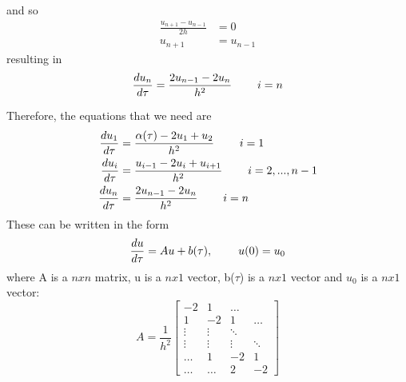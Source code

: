 \documentclass{article}
\begin{document}
and so
\begin{equation*}
\begin{split}
    \frac{u_{n+1}-u_{n-1}}{2h} &= 0 \\
    u_{n+1} &= u_{n-1}
\end{split}
\end{equation*}
resulting in
\begin{equation*}
    \frac{d u_n}{d\tau} = \frac{2u_{n-1} - 2u_n}{h^2}  \hspace{0.8cm} i = n
\end{equation*}

\noindent
Therefore, the equations that we need are
\begin{equation*}
\begin{split}
    \frac{d u_1}{d\tau} &= \frac{\alpha(\tau) - 2u_1 + u_{2}}{h^2}  \hspace{0.8cm} i = 1 \\
    \frac{d u_i}{d\tau} &= \frac{u_{i-1} - 2u_i + u_{i+1}}{h^2}  \hspace{0.8cm} i = 2, ..., n-1    \\
    \frac{d u_n}{d\tau} &= \frac{2u_{n-1} - 2u_n}{h^2}  \hspace{0.8cm} i = n
\end{split}
\end{equation*}
These can be written in the form
\begin{equation*}
    \frac{d u}{d \tau} = Au + b(\tau), \hspace{0.8cm} u(0) = u_0
\end{equation*}
where A is a $ n x n$ matrix, u is a $n x 1$ vector, b($\tau$) is a $n x 1$ vector and $u_0$ is a $n x 1$ vector:
\begin{equation*}
    A = \frac{1}{h^2} 
\begin{bmatrix}
    -2 & 1 & \dots  \\
    1 & -2 & 1 & \dots \\
    \vdots & \vdots & \ddots \\
    \vdots & \vdots & \vdots & \ddots \\
    \dots & 1 & -2 & 1 \\
    \dots & \dots & 2 & -2
\end{bmatrix}
\end{equation*}
\end{document}
